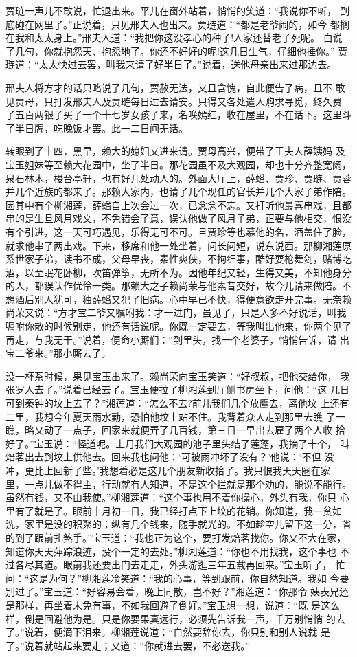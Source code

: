 贾琏一声儿不敢说，忙退出来。平儿在窗外站着，悄悄的笑道：“我说你不听，
到底碰在网里了。”正说着，只见邢夫人也出来。贾琏道：“都是老爷闹的，如今
都搁在我和太太身上。”邢夫人道：“我把你这没孝心的种子!人家还替老子死呢。
白说了几句，你就抱怨天、抱怨地了。你还不好好的呢!这几日生气，仔细他捶你。”
贾琏道：“太太快过去罢，叫我来请了好半日了。”说着，送他母亲出来过那边去。

邢夫人将方才的话只略说了几句，贾赦无法，又且含愧，自此便告了病，且不
敢见贾母，只打发邢夫人及贾琏每日过去请安。只得又各处遣人购求寻觅，终久费
了五百两银子买了一个十七岁女孩子来，名唤嫣红，收在屋里，不在话下。这里斗
了半日牌，吃晚饭才罢。此一二日间无话。

转眼到了十四，黑早，赖大的媳妇又进来请。贾母高兴，便带了王夫人薛姨妈
及宝玉姐妹等至赖大花园中，坐了半日。那花园虽不及大观园，却也十分齐整宽阔，
泉石林木，楼台亭轩，也有好几处动人的。外面大厅上，薛蟠、贾珍、贾琏、贾蓉
并几个近族的都来了。那赖大家内，也请了几个现任的官长并几个大家子弟作陪。
因其中有个柳湘莲，薛蟠自上次会过一次，已念念不忘。又打听他最喜串戏，且都
串的是生旦风月戏文，不免错会了意，误认他做了风月子弟，正要与他相交，恨没
有个引进，这一天可巧遇见，乐得无可不可。且贾珍等也慕他的名，酒盖住了脸，
就求他串了两出戏。下来，移席和他一处坐着，问长问短，说东说西。那柳湘莲原
系世家子弟，读书不成，父母早丧，素性爽侠，不拘细事，酷好耍枪舞剑，赌博吃
酒，以至眠花卧柳，吹笛弹筝，无所不为。因他年纪又轻，生得又美，不知他身分
的人，都误认作优伶一类。那赖大之子赖尚荣与他素昔交好，故今儿请来做陪。不
想酒后别人犹可，独薛蟠又犯了旧病。心中早已不快，得便意欲走开完事。无奈赖
尚荣又说：“方才宝二爷又嘱咐我：才一进门，虽见了，只是人多不好说话，叫我
嘱咐你散的时候别走，他还有话说呢。你既一定要去，等我叫出他来，你两个见了
再走，与我无干。”说着，便命小厮们：“到里头，找一个老婆子，悄悄告诉，请
出宝二爷来。”那小厮去了。

没一杯茶时候，果见宝玉出来了。赖尚荣向宝玉笑道：“好叔叔，把他交给你，
我张罗人去了。”说着已经去了。宝玉便拉了柳湘莲到厅侧书房坐下，问他：“这
几日可到秦钟的坟上去了？”湘莲道：“怎么不去?前儿我们几个放鹰去，离他坟
上还有二里，我想今年夏天雨水勤，恐怕他坟上站不住。我背着众人走到那里去瞧
了一瞧，略又动了一点子，回家来就便弄了几百钱，第三日一早出去雇了两个人收
拾好了。”宝玉说：“怪道呢。上月我们大观园的池子里头结了莲蓬，我摘了十个，
叫焙茗出去到坟上供他去。回来我也问他：‘可被雨冲坏了没有？’他说：‘不但
没冲，更比上回新了些。’我想着必是这几个朋友新收拾了。我只恨我天天圈在家
里，一点儿做不得主，行动就有人知道，不是这个拦就是那个劝的，能说不能行。
虽然有钱，又不由我使。”柳湘莲道：“这个事也用不着你操心，外头有我，你只
心里有了就是了。眼前十月初一日，我已经打点下上坟的花销。你知道，我一贫如
洗，家里是没的积聚的；纵有几个钱来，随手就光的。不如趁空儿留下这一分，省
的到了跟前扎煞手。”宝玉道：“我也正为这个，要打发焙茗找你。你又不大在家，
知道你天天萍踪浪迹，没个一定的去处。”柳湘莲道：“你也不用找我，这个事也
不过各尽其道。眼前我还要出门去走走，外头游逛三年五载再回来。”宝玉听了，
忙问：“这是为何？”柳湘莲冷笑道：“我的心事，等到跟前，你自然知道。我如
今要别过了。”宝玉道：“好容易会着，晚上同散，岂不好？”湘莲道：“你那令
姨表兄还是那样，再坐着未免有事，不如我回避了倒好。”宝玉想一想，说道：“既
是这么样，倒是回避他为是。只是你要果真远行，必须先告诉我一声，千万别悄悄
的去了。”说着，便滴下泪来。柳湘莲说道：“自然要辞你去，你只别和别人说就
是了。”说着就站起来要走；又道：“你就进去罢，不必送我。”

